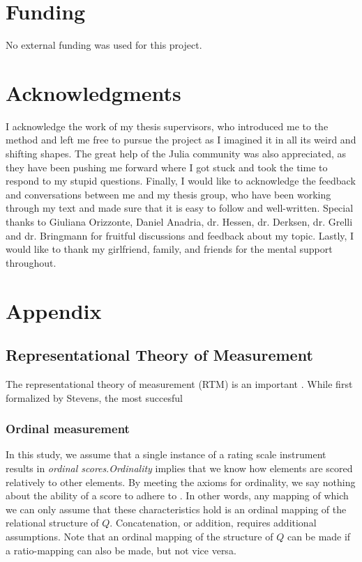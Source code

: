 \documentclass[utf8]{FrontiersinVancouver}
\begin{document}
\section*{Funding}
No external funding was used for this project.

\section*{Acknowledgments}
I acknowledge the work of my thesis supervisors, who introduced me to the method and left me free to pursue the project as I imagined it in all its weird and shifting shapes.  The great help of the Julia community was also appreciated, as they have been pushing me forward where I got stuck and took the time to respond to my stupid questions. Finally, I would like to acknowledge the feedback and conversations between me and my thesis group, who have been working through my text and made sure that it is easy to follow and well-written. Special thanks to Giuliana Orizzonte, Daniel Anadria, dr. Hessen, dr. Derksen, dr. Grelli and dr. Bringmann for fruitful discussions and feedback about my topic. Lastly, I would like to thank my girlfriend, family, and friends for the mental support throughout.

\section*{Appendix}

\subsection{Representational Theory of Measurement}
The representational theory of measurement (RTM) is an important . While first formalized by Stevens, the most succesful 

\subsubsection{Ordinal measurement}
In this study, we assume that a single instance of a rating scale instrument results in \textit{ordinal scores}.\textit{Ordinality} implies that we know how elements are scored relatively to other elements. By meeting the axioms for ordinality, we say nothing about the ability of a score to adhere to . In other words, any mapping of which we can only assume that these characteristics hold is an ordinal mapping of the relational structure of $Q$. Concatenation, or addition, requires additional assumptions. Note that an ordinal mapping of the structure of $Q$ can be made if a ratio-mapping can also be made, but not vice versa. 
\end{document}
